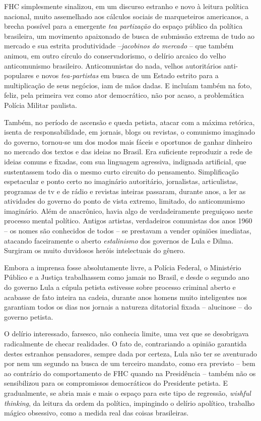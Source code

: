 FHC simplesmente sinalizou, em um discurso estranho e novo à leitura
política nacional, muito assemelhado aos cálculos sociais de
marqueteiros americanos, a brecha possível para a emergente \emph{tea
partização} do espaço público da política brasileira, um movimento
apaixonado de busca de submissão extrema de tudo ao mercado e sua
estrita produtividade --\emph{jacobinos do mercado} -- que também
animou, em outro círculo do conservadorismo, o delírio arcaico do velho
anticomunismo brasileiro. Anticomunistas do nada, velhos autoritários
anti-populares e novos \emph{tea-partistas} em busca de um Estado
estrito para a multiplicação de seus negócios, iam de mãos dadas. E
incluíam também na foto, feliz, pela primeira vez como ator democrático,
não por acaso, a problemática Polícia Militar paulista.

Também, no período de ascensão e queda petista, atacar com a máxima
retórica, isenta de responsabilidade, em jornais, blogs ou revistas, o
comunismo imaginado do governo, tornou-se um dos modos mais fáceis e
oportunos de ganhar dinheiro no mercado dos textos e das ideias no
Brasil. Era suficiente reproduzir a rede de ideias comuns e fixadas, com
sua linguagem agressiva, indignada artificial, que sustentassem todo dia
o mesmo curto circuito do pensamento. Simplificação espetacular e ponto
certo no imaginário autoritário, jornalistas, articulistas, programas de
tv e de rádio e revistas inteiras passaram, durante anos, a ler as
atividades do governo do ponto de vista extremo, limitado, do
anticomunismo imaginário. Além de anacrônico, havia algo de
verdadeiramente preguiçoso neste processo mental político. Antigos
artistas, verdadeiros comunistas dos anos 1960 -- os nomes são
conhecidos de todos -- se prestavam a vender opiniões imediatas,
atacando faceiramente o aberto \emph{estalinismo} dos governos de Lula e
Dilma. Surgiram os muito duvidosos heróis intelectuais do gênero.

Embora a imprensa fosse absolutamente livre, a Polícia Federal, o
Ministério Público e a Justiça trabalhassem como jamais no Brasil, e
desde o segundo ano do governo Lula a cúpula petista estivesse sobre
processo criminal aberto e acabasse de fato inteira na cadeia, durante
anos homens muito inteligentes nos garantiam todos os dias nos jornais a
natureza ditatorial fixada -- alucinose -- do governo petista.

O delírio interessado, farsesco, não conhecia limite, uma vez que se
desobrigava radicalmente de checar realidades. O fato de, contrariando a
opinião garantida destes estranhos pensadores, sempre dada por certeza,
Lula não ter se aventurado por nem um segundo na busca de um terceiro
mandato, como era previsto -- bem ao contrário do comportamento de FHC
quando na Presidência -- também não os sensibilizou para os compromissos
democráticos do Presidente petista. E gradualmente, se abria mais e mais
o espaço para este tipo de regressão, \emph{wishful thinking}, da
leitura da ordem da política, impingindo o delírio apolítico, trabalho
mágico obsessivo, como a medida real das coisas brasileiras.

